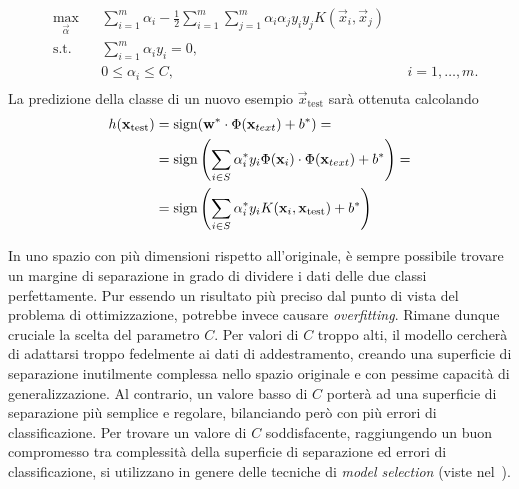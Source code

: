\begin{equation}\label{eq:svc:softmargin:wolfe_dual_plus_kernel_trick}
\begin{aligned}
& \max_{\vec{\alpha}}    && \sum_{i=1}^{m}\alpha_i - \frac{1}{2}\sum_{i=1}^{m}\sum_{j=1}^{m}\alpha_i\alpha_jy_iy_jK(\Vec{x}_i, \Vec{x}_j)\\
& \textrm{s.t.} && \sum_{i=1}^{m} \alpha_iy_i = 0, \\
&               && 0 \leq \alpha_i \leq C, && i=1,\dots,m. \\
\end{aligned}
\end{equation}
%
La predizione della classe di un nuovo esempio $\Vec{x}_\text{test}$ sarà ottenuta calcolando 
\begin{align*}
h(\Vec{x}_\text{test})  &= \sign(\Vec{w}^*\cdot\Phi(\vec{x}_{text}) +b^*) =\\
                        &= \sign\left(\sum_{i\in S} \alpha_i^*y_i \Phi(\vec{x}_i) \cdot \Phi(\vec{x}_{text}) + b^*\right)=\\
                        &= \sign\left(\sum_{i \in S}\alpha_i^*y_iK(\Vec{x}_i, \Vec{x}_\text{test}) + b^*\right)
\end{align*}

In uno spazio con più dimensioni rispetto all'originale, è sempre possibile trovare un margine di separazione in grado di dividere i dati delle due classi perfettamente. %
Pur essendo un risultato più preciso dal punto di vista del problema di ottimizzazione, potrebbe invece causare \emph{overfitting}. Rimane dunque cruciale la scelta del parametro $C$. 
Per valori di $C$ troppo alti, il modello cercherà di adattarsi troppo fedelmente ai dati di addestramento, creando una superficie di separazione inutilmente complessa nello spazio originale e con pessime capacità di generalizzazione. 
Al contrario, un valore basso di $C$ porterà ad una superficie di separazione più semplice e regolare, bilanciando però con più errori di classificazione. 
Per trovare un valore di $C$ soddisfacente, raggiungendo un buon compromesso tra complessità della superficie di separazione ed errori di classificazione, si utilizzano in genere delle tecniche di \emph{model selection} (viste nel~).  


